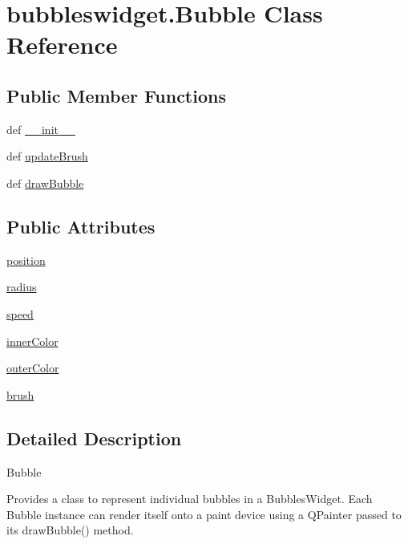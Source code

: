 \hypertarget{classbubbleswidget_1_1Bubble}{}\section{bubbleswidget.\+Bubble Class Reference}
\label{classbubbleswidget_1_1Bubble}
\subsection*{Public Member Functions}
\begin{DoxyCompactItemize}
\item 
def \hyperlink{classbubbleswidget_1_1Bubble_a7e3835c2f605b18034f67e5b9d5e474d}{\+\_\+\+\_\+init\+\_\+\+\_\+}
\item 
def \hyperlink{classbubbleswidget_1_1Bubble_a4fe2b90e4005668e860e5fedb60b7067}{update\+Brush}
\item 
def \hyperlink{classbubbleswidget_1_1Bubble_a993054a88a4048db88904f0e3e701114}{draw\+Bubble}
\end{DoxyCompactItemize}
\subsection*{Public Attributes}
\begin{DoxyCompactItemize}
\item 
\hyperlink{classbubbleswidget_1_1Bubble_a40c35e5a4e23023b1687ec1e9718c115}{position}
\item 
\hyperlink{classbubbleswidget_1_1Bubble_a4ec512884f4f49de140fdf72efe6fc15}{radius}
\item 
\hyperlink{classbubbleswidget_1_1Bubble_a28beb99c59e243b9c78fc7ab1de2f2b0}{speed}
\item 
\hyperlink{classbubbleswidget_1_1Bubble_a34b627eeb1b4ebd7ed1d3ebd7eb210a5}{inner\+Color}
\item 
\hyperlink{classbubbleswidget_1_1Bubble_a3d2429b431cbfcf300e07312a5e5e303}{outer\+Color}
\item 
\hyperlink{classbubbleswidget_1_1Bubble_a446cf59ca21bea8918c3a7833580af18}{brush}
\end{DoxyCompactItemize}


\subsection{Detailed Description}
\begin{DoxyVerb}Bubble

Provides a class to represent individual bubbles in a BubblesWidget.
Each Bubble instance can render itself onto a paint device using a
QPainter passed to its drawBubble() method.
\end{DoxyVerb}
 

